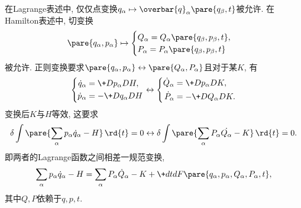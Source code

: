 \documentclass[../LectureNotes.tex]{subfiles}
\begin{document}
在Lagrange表述中, 仅仅点变换$q_\alpha\mapsto \overbar{q}_\alpha\pare{q_\beta,t}$被允许. 在Hamilton表述中, 切变换
\[ \pare{q_\alpha,p_\alpha} \mapsto \begin{cases}
    Q_\alpha = Q_\alpha \pare{q_\beta,p_\beta,t}, \\
    P_\alpha = P_\alpha\pare{q_\beta,p_\beta,t}
\end{cases} \]
被允许. 正则变换要求$\pare{q_\alpha,p_\alpha}\leftrightarrow \pare{Q_\alpha,P_\alpha}$且对于某$K$, 有
\[ \left\{\begin{aligned}
    \dot{q}_\alpha &= \+D{p_\alpha}DH, \\
    \dot{p}_\alpha &= -\+D{q_\alpha}DH
\end{aligned}\right. \leftrightarrow \left\{\begin{aligned}
    \dot{Q}_\alpha &= \+D{p_\alpha}DK, \\
    \dot{P}_\alpha &= -\+D{Q_\alpha}DK.
\end{aligned}\right. \]
变换后$K$与$H$等效, 这要求
\[ \delta \int\pare{\sum_\alpha p_\alpha\dot{q}_\alpha - H}\,\rd{t} = 0 \leftrightarrow \delta \int\pare{\sum_\alpha P_\alpha\dot{Q_\alpha} - K}\,\rd{t} = 0. \]
即两者的Lagrange函数之间相差一规范变换,
\[ \sum_\alpha p_\alpha \dot{q}_\alpha - H = \sum_\alpha P_\alpha\dot{Q}_\alpha - K + \+dtd{}F\pare{q_\alpha,p_\alpha,Q_\alpha,P_\alpha,t}, \]
其中$Q,P$依赖于$q,p,t$.
\end{document}
